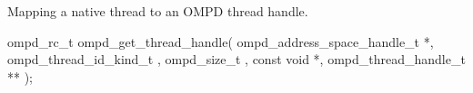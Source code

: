 %
%
\label{subsubsubsec:ompd_get_master_thread_in_parallel}
%
%
%
%
%
%
%


\label{subsubsubsec:ompd_get_thread_handle}
\summary
Mapping a native thread to an OMPD thread handle.
\format
\begin{cspecific}
\begin{ompSyntax}
ompd_rc_t ompd_get_thread_handle(
  ompd_address_space_handle_t *,
  ompd_thread_id_kind_t ,
  ompd_size_t ,
  const void *,
  ompd_thread_handle_t **
);
\end{ompSyntax}
\end{cspecific}

